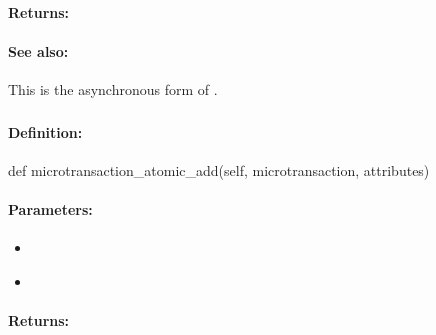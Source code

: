 \paragraph{Returns:}


\paragraph{See also:}  This is the asynchronous form of .

\pagebreak
\subsubsection{}
\label{api:python:microtransaction_atomic_add}


\paragraph{Definition:}
\begin{pythoncode}
def microtransaction_atomic_add(self, microtransaction, attributes)
\end{pythoncode}

\paragraph{Parameters:}
\begin{itemize}[noitemsep]
\item {}\\

\item {}\\

\end{itemize}

\paragraph{Returns:}


\pagebreak
\subsubsection{}
\label{api:python:cond_atomic_add}


